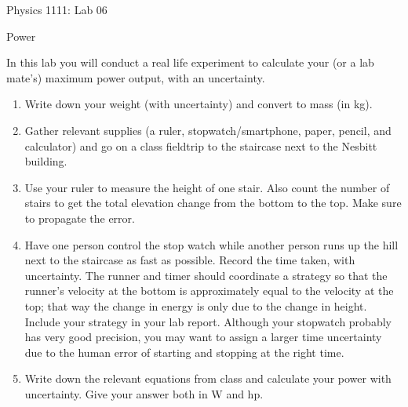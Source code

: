 \documentclass[12pt]{article}
\begin{document}
{\centering
\large Physics 1111: Lab 06 \par
\large Power \par
}
\hfill \break \vspace{-4mm}

In this lab you will conduct a real life experiment to calculate your (or a lab mate's) maximum power output, with an uncertainty.

\begin{enumerate}
\item Write down your weight (with uncertainty) and convert to mass (in kg).
\item Gather relevant supplies (a ruler, stopwatch/smartphone, paper, pencil, and calculator) and go on a class fieldtrip to the staircase next to the Nesbitt building.
\item Use your ruler to measure the height of one stair. Also count the number of stairs to get the total elevation change from the bottom to the top. Make sure to propagate the error.
\item Have one person control the stop watch while another person runs up the hill next to the staircase as fast as possible. Record the time taken, with uncertainty. The runner and timer should coordinate a strategy so that the runner's velocity at the bottom is approximately equal to the velocity at the top; that way the change in energy is only due to the change in height. Include your strategy in your lab report. Although your stopwatch probably has very good precision, you may want to assign a larger time uncertainty due to the human error of starting and stopping at the right time.
\item Write down the relevant equations from class and calculate your power with uncertainty. Give your answer both in W and hp.
\end{enumerate}
\end{document}
